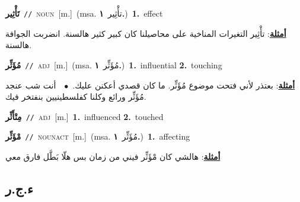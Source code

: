 \documentclass[10pt,a4paper,twoside]{article} %
\begin{document}
\begin{multicols}{2}
{{{{\setlength\topsep{0pt}\textbf{\foreignlanguage{arabic}{تَأْثِير}}\ {\color{gray}\texttt{//}\color{black}}\ \textsc{noun}\ [m.]\ \color{gray}(msa. \foreignlanguage{arabic}{تأْثِير}~\foreignlanguage{arabic}{\textbf{١.}})\color{black}\ \textbf{1.}~effect\  \begin{flushright}\color{gray}\foreignlanguage{arabic}{\textbf{\underline{\foreignlanguage{arabic}{أمثلة}}}: تأْثِير التغيرات المناخية على محاصيلنا كان كبير كثير هالسنة. انضربت الجوافة هالسنة.}\end{flushright}\color{black}} \vspace{2mm}

{\setlength\topsep{0pt}\textbf{\foreignlanguage{arabic}{مُؤَثِّر}}\ {\color{gray}\texttt{//}\color{black}}\ \textsc{adj}\ [m.]\ \color{gray}(msa. \foreignlanguage{arabic}{مُؤَثِّر}~\foreignlanguage{arabic}{\textbf{١.}})\color{black}\ \textbf{1.}~influential  \textbf{2.}~touching\  \begin{flushright}\color{gray}\foreignlanguage{arabic}{\textbf{\underline{\foreignlanguage{arabic}{أمثلة}}}: بعتذر لأني فتحت موضوع مُؤَثِّر. ما كان قصدي أعكنن عليك.\ $\bullet$\ \  أنت شب عنجد مُؤَثِّر ورائع وكلنا كفلسطينيين بنفتخر فيك.}\end{flushright}\color{black}} \vspace{2mm}

{\setlength\topsep{0pt}\textbf{\foreignlanguage{arabic}{مِتْأَثِّر}}\ {\color{gray}\texttt{//}\color{black}}\ \textsc{adj}\ [m.]\ \textbf{1.}~influenced  \textbf{2.}~touched\ 

{\setlength\topsep{0pt}\textbf{\foreignlanguage{arabic}{مْؤَثِّر}}\ {\color{gray}\texttt{//}\color{black}}\ \textsc{noun\textunderscore act}\ [m.]\ \color{gray}(msa. \foreignlanguage{arabic}{مُؤَثِّر}~\foreignlanguage{arabic}{\textbf{١.}})\color{black}\ \textbf{1.}~affecting\  \begin{flushright}\color{gray}\foreignlanguage{arabic}{\textbf{\underline{\foreignlanguage{arabic}{أمثلة}}}: هالشي كان مْؤَثِّر فيني من زمان بس هلّا بَطَّل فارق معي}\end{flushright}\color{black}} \vspace{2mm}

\vspace{-3mm}
\subsection*{\color{blue}\foreignlanguage{arabic}{ء.ج.ر}\color{blue}{}} 

}}}}
\end{multicols}
\end{document}

